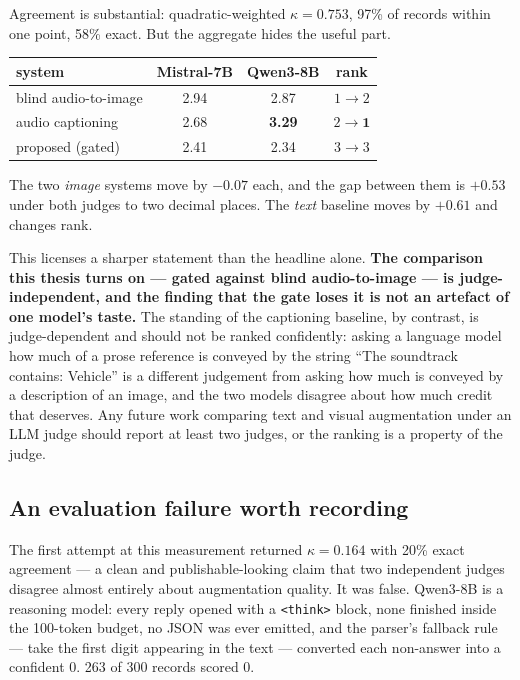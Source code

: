\documentclass[11pt,a4paper]{article}
\begin{document}
Agreement is substantial: quadratic-weighted $\kappa = 0.753$, 97\% of records within one point,
58\% exact. But the aggregate hides the useful part.

\begin{center}\begin{tabular}{lccc}
\toprule
system & Mistral-7B & Qwen3-8B & rank \\
\midrule
blind audio-to-image & 2.94 & 2.87 & $1 \rightarrow 2$ \\
audio captioning     & 2.68 & \textbf{3.29} & $2 \rightarrow \mathbf{1}$ \\
proposed (gated)     & 2.41 & 2.34 & $3 \rightarrow 3$ \\
\bottomrule
\end{tabular}\end{center}

The two \emph{image} systems move by $-0.07$ each, and the gap between them is $+0.53$ under both
judges to two decimal places. The \emph{text} baseline moves by $+0.61$ and changes rank.

This licenses a sharper statement than the headline alone. \textbf{The comparison this thesis turns
on --- gated against blind audio-to-image --- is judge-independent, and the finding that the gate
loses it is not an artefact of one model's taste.} The standing of the captioning baseline, by
contrast, is judge-dependent and should not be ranked confidently: asking a language model how much
of a prose reference is conveyed by the string ``The soundtrack contains: Vehicle'' is a different
judgement from asking how much is conveyed by a description of an image, and the two models disagree
about how much credit that deserves. Any future work comparing text and visual augmentation under an
LLM judge should report at least two judges, or the ranking is a property of the judge.

\subsection{An evaluation failure worth recording}\label{sec:judgeartefact}
The first attempt at this measurement returned $\kappa = 0.164$ with 20\% exact agreement --- a clean
and publishable-looking claim that two independent judges disagree almost entirely about augmentation
quality. It was false. Qwen3-8B is a reasoning model: every reply opened with a \texttt{<think>}
block, none finished inside the 100-token budget, no JSON was ever emitted, and the parser's fallback
rule --- take the first digit appearing in the text --- converted each non-answer into a confident 0.
263 of 300 records scored 0.
\end{document}
